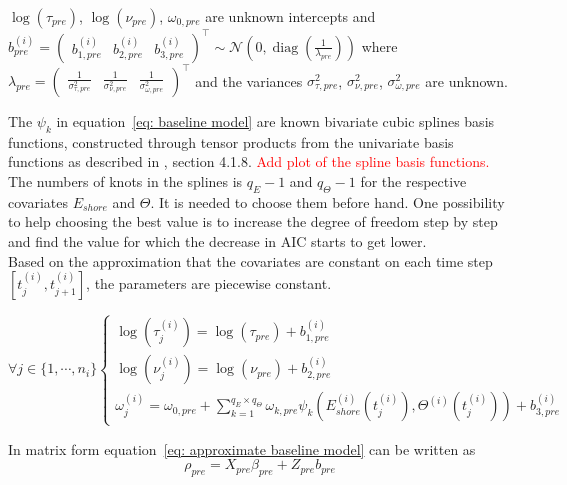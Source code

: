 \documentclass[11pt]{article}
\DeclareMathOperator{\diag}{diag}
\newcommand {\1}{\mathbb{1}}
\begin{document}
$\log(\tau_{pre})$, $\log(\nu_{pre})$, $\omega_{0,pre}$ are unknown intercepts and $b^{(i)}_{pre}=\begin{pmatrix} b_{1,pre}^{(i)} & b_{2,pre}^{(i)} & b_{3,pre}^{(i)} \end{pmatrix}^\top \sim \mathcal{N}\left( 0, \diag\left(\frac{1}{\lambda_{pre}}\right)\right)$
where $\lambda_{pre}=\begin{pmatrix} \frac{1}{\sigma_{\tau,pre}^2} & \frac{1}{\sigma_{\nu,pre}^2} & \frac{1}{\sigma_{\omega,pre}^2} \end{pmatrix}^\top$ and the variances $\sigma_{\tau,pre}^2$, $\sigma_{\nu,pre}^2$, $\sigma_{\omega,pre}^2$ are unknown.

The $\psi_k$ in equation~\ref{eq: baseline model} are  known bivariate cubic splines basis functions, constructed through tensor products from the univariate basis functions as described in \cite{wood_generalized_2017}, section 4.1.8.
\textcolor{red}{Add plot of the spline basis functions.}\\
The numbers of knots in the splines is $q_E-1$ and $q_{\Theta}-1$ for the respective covariates $E_{shore}$ and $\Theta$. It is needed to choose them before hand. One possibility to help choosing the best value is to increase the degree of freedom step by step  and find the value for which the decrease in AIC starts to get lower. \\
Based on the approximation that the covariates are constant on each time step $[t_j^{(i)},t_{j+1}^{(i)}]$, the parameters are piecewise constant.

\begin{equation} 
	\forall j \in \{1,\cdots, n_i\}
	 \left\{
	\begin{array}{l}
		
		\log(\tau^{(i)}_j)=\log(\tau_{pre})+b_{1,pre}^{(i)} \\
		\log(\nu^{(i)}_j)=\log(\nu_{pre})+b_{2,pre}^{(i)}  \\
		\omega^{(i)}_j=\omega_{0,pre}+\sum_{k=1}^{q_E \times q_{\Theta}} \omega_{k,pre} \psi_k(E_{shore}^{(i)}(t_j^{(i)}),\Theta^{(i)}(t_j^{(i)})) + b_{3,pre}^{(i)}
	\end{array}
	\right.
	\label{eq: approximate baseline model}
\end{equation}


In matrix form equation~\ref{eq: approximate baseline model} can be written as
\begin{equation}
	\rho_{pre}= X_{pre} \beta_{pre}
	+Z_{pre}b_{pre}
\end{equation}
\end{document}
